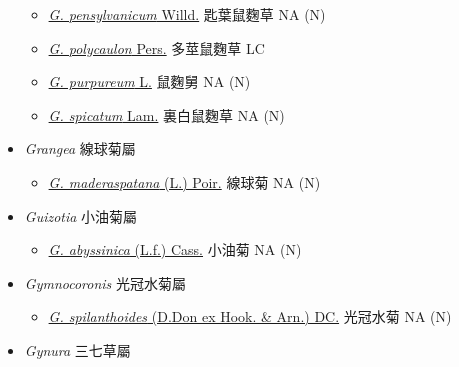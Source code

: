 \begin{itemize}
\begin{itemize}
        \item[] \href{http://www.theplantlist.org/tpl1.1/search?q=Gnaphalium+pensylvanicum}{\textit{G. pensylvanicum} Willd.}   匙葉鼠麴草   NA (N)
        \item[] \href{http://www.theplantlist.org/tpl1.1/search?q=Gnaphalium+polycaulon}{\textit{G. polycaulon} Pers.}   多莖鼠麴草   LC
        \item[] \href{http://www.theplantlist.org/tpl1.1/search?q=Gnaphalium+purpureum}{\textit{G. purpureum} L.}   鼠麴舅   NA (N)
        \item[] \href{http://www.theplantlist.org/tpl1.1/search?q=Gnaphalium+spicatum}{\textit{G. spicatum} Lam.}   裏白鼠麴草   NA (N)
  \end{itemize}
 \item[] \textit{Grangea} 線球菊屬
                                
  \begin{itemize}
        \item[] \href{http://www.theplantlist.org/tpl1.1/search?q=Grangea+maderaspatana}{\textit{G. maderaspatana} (L.) Poir.}   線球菊   NA (N)
  \end{itemize}
 \item[] \textit{Guizotia} 小油菊屬
                                
  \begin{itemize}
        \item[] \href{http://www.theplantlist.org/tpl1.1/search?q=Guizotia+abyssinica}{\textit{G. abyssinica} (L.f.) Cass.}   小油菊   NA (N)
  \end{itemize}
 \item[] \textit{Gymnocoronis} 光冠水菊屬
                                
  \begin{itemize}
        \item[] \href{http://www.theplantlist.org/tpl1.1/search?q=Gymnocoronis+spilanthoides}{\textit{G. spilanthoides} (D.Don ex Hook. \& Arn.) DC.}   光冠水菊   NA (N)
  \end{itemize}
 \item[] \textit{Gynura} 三七草屬
                                

\end{itemize}
